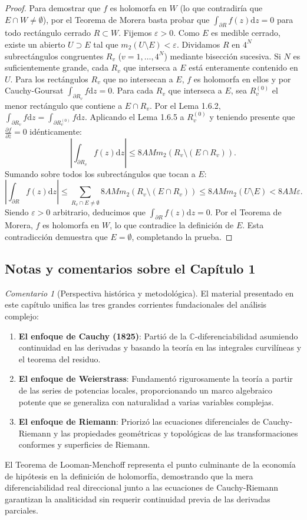 \documentclass[11pt,a4paper]{article}
\theoremstyle{definition}
\theoremstyle{remark}
\newtheorem{observacion}{Comentario}[section]
\numberwithin{equation}{section}
\newcommand{\dz}{\mathrm{d}z}
\begin{document}
\begin{proof}
Para demostrar que $f$ es holomorfa en $W$ (lo que contradiría que $E \cap W \neq \emptyset$), por el Teorema de Morera basta probar que $\int_{\partial R} f(z) \dz = 0$ para todo rectángulo cerrado $R \subset W$.
Fijemos $\varepsilon > 0$. Como $E$ es medible cerrado, existe un abierto $U \supset E$ tal que $m_2(U \setminus E) < \varepsilon$. Dividamos $R$ en $4^N$ subrectángulos congruentes $R_v$ ($v = 1, \dots, 4^N$) mediante bisección sucesiva. Si $N$ es suficientemente grande, cada $R_v$ que interseca a $E$ está enteramente contenido en $U$. 
Para los rectángulos $R_v$ que no intersecan a $E$, $f$ es holomorfa en ellos y por Cauchy-Goursat $\int_{\partial R_v} f \dz = 0$. 
Para cada $R_v$ que interseca a $E$, sea $R_v^{(0)}$ el menor rectángulo que contiene a $E \cap R_v$. Por el Lema 1.6.2, $\int_{\partial R_v} f \dz = \int_{\partial R_v^{(0)}} f \dz$. Aplicando el Lema 1.6.5 a $R_v^{(0)}$ y teniendo presente que $\frac{\partial f}{\partial \bar{z}} = 0$ idénticamente:
\[
\left| \int_{\partial R_v} f(z) \dz \right| \le 8AM m_2(R_v \setminus (E \cap R_v)).
\]
Sumando sobre todos los subrectángulos que tocan a $E$:
\[
\left| \int_{\partial R} f(z) \dz \right| \le \sum_{R_v \cap E \neq \emptyset} 8AM m_2(R_v \setminus (E \cap R_v)) \le 8AM m_2(U \setminus E) < 8AM \varepsilon.
\]
Siendo $\varepsilon > 0$ arbitrario, deducimos que $\int_{\partial R} f(z) \dz = 0$. Por el Teorema de Morera, $f$ es holomorfa en $W$, lo que contradice la definición de $E$. Esta contradicción demuestra que $E = \emptyset$, completando la prueba.
\end{proof}

\subsection{Notas y comentarios sobre el Capítulo 1}

\begin{observacion}[Perspectiva histórica y metodológica]
El material presentado en este capítulo unifica las tres grandes corrientes fundacionales del análisis complejo:
\begin{enumerate}
\item \textbf{El enfoque de Cauchy (1825)}: Partió de la $\mathbb{C}$-diferenciabilidad asumiendo continuidad en las derivadas y basando la teoría en las integrales curvilíneas y el teorema del residuo.
\item \textbf{El enfoque de Weierstrass}: Fundamentó rigurosamente la teoría a partir de las series de potencias locales, proporcionando un marco algebraico potente que se generaliza con naturalidad a varias variables complejas.
\item \textbf{El enfoque de Riemann}: Priorizó las ecuaciones diferenciales de Cauchy-Riemann y las propiedades geométricas y topológicas de las transformaciones conformes y superficies de Riemann.
\end{enumerate}
El Teorema de Looman-Menchoff representa el punto culminante de la economía de hipótesis en la definición de holomorfía, demostrando que la mera diferenciabilidad real direccional junto a las ecuaciones de Cauchy-Riemann garantizan la analiticidad sin requerir continuidad previa de las derivadas parciales.
\end{observacion}
\end{document}

